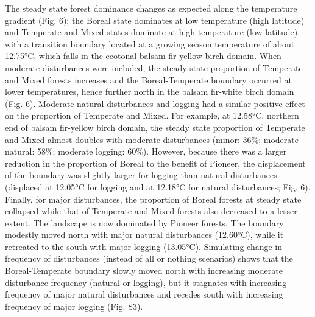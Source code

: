 \documentclass[a4paperpaper,]{article}
\begin{document}
The steady state forest dominance changes as expected along the
temperature gradient (Fig. 6); the Boreal state dominates at low
temperature (high latitude) and Temperate and Mixed states dominate at
high temperature (low latitude), with a transition boundary located at a
growing season temperature of about 12.75°C, which falls in the ecotonal
balsam fir-yellow birch domain. When moderate disturbances were
included, the steady state proportion of Temperate and Mixed forests
increases and the Boreal-Temperate boundary occurred at lower
temperatures, hence further north in the balsam fir-white birch domain
(Fig. 6). Moderate natural disturbances and logging had a similar
positive effect on the proportion of Temperate and Mixed. For example,
at 12.58°C, northern end of balsam fir-yellow birch domain, the steady
state proportion of Temperate and Mixed almost doubles with moderate
disturbances (minor: 36\%; moderate natural: 58\%; moderate logging:
60\%). However, because there was a larger reduction in the proportion
of Boreal to the benefit of Pioneer, the displacement of the boundary
was slightly larger for logging than natural disturbances (displaced at
12.05°C for logging and at 12.18°C for natural disturbances; Fig. 6).
Finally, for major disturbances, the proportion of Boreal forests at
steady state collapsed while that of Temperate and Mixed forests also
decreased to a lesser extent. The landscape is now dominated by Pioneer
forests. The boundary modestly moved north with major natural
disturbances (12.60°C), while it retreated to the south with major
logging (13.05°C). Simulating change in frequency of disturbances
(instead of all or nothing scenarios) shows that the Boreal-Temperate
boundary slowly moved north with increasing moderate disturbance
frequency (natural or logging), but it stagnates with increasing
frequency of major natural disturbances and recedes south with
increasing frequency of major logging (Fig. S3).
\end{document}
